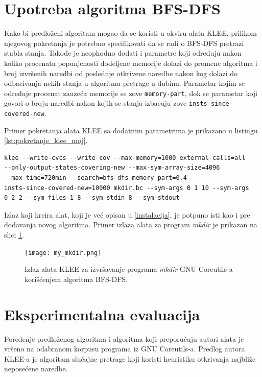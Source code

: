 \documentclass[12pt,oneside]{memoir}
\begin{document}
\section{Upotreba algoritma BFS-DFS}

Kako bi predloženi algoritam mogao da se koristi u okviru alata KLEE, prilikom njegovog pokretanja je potrebno specifikovati da se radi o BFS-DFS pretrazi stabla stanja. Takođe je neophodno dodati i parametre koji određuju nakon koliko procenata popunjenosti dodeljene memorije dolazi do promene algoritma i broj izvršenih naredbi od poslednje otkrivene naredbe nakon kog dolazi do odbacivanja nekih stanja u algoritmu pretrage u dubinu. Parametar kojim se određuje procenat zauzeća memorije se zove \texttt{memory-part}, dok se parametar koji govori o broju naredbi nakon kojih se stanja izbacuju zove \texttt{insts-since-covered-new}. 

Primer pokretanja alata KLEE sa dodatnim parametrima je prikazano u listingu \ref{lst:pokretanje_klee_moj}.

\begin{lstlisting}[caption={Primer pokretanja alata KLEE gde se za pretragu stabla stanja koristi algoritam BFS-DFS.}, label={lst:pokretanje_klee_moj}, captionpos=b]
klee --write-cvcs --write-cov --max-memory=1000 external-calls=all
--only-output-states-covering-new --max-sym-array-size=4096 
--max-time=720min --search=bfs-dfs memory-part=0.4 
insts-since-covered-new=10000 mkdir.bc --sym-args 0 1 10 --sym-args 
0 2 2 --sym-files 1 8 --sym-stdin 8 --sym-stdout

\end{lstlisting}

Izlaz koji kreira alat, koji je već opisan u \ref{instalacija}, je potpuno isti kao i pre dodavanja novog algoritma. Primer izlaza alata za program \textit{mkdir} je prikazan na slici \ref{fig:my_mkdir}.

\begin{figure}[ht]
    \centering
    \texttt{[image: my\_mkdir.png]}
    \caption{Izlaz alata KLEE za izvršavanje programa \textit{mkdir} GNU Coreutils-a korišćenjem algoritma BFS-DFS.}
    \label{fig:my_mkdir}
\end{figure}

\section{Eksperimentalna evaluacija}
Poređenje predloženog algoritma i algoritma koji preporučuju autori alata je vršeno na odabranom korpusu programa iz GNU Coreutils-a. Predlog autora KLEE-a \cite{klee} je algoritam slučajne pretrage koji koristi heuristiku otkrivanja najbliže neposećene naredbe. 
\end{document}
